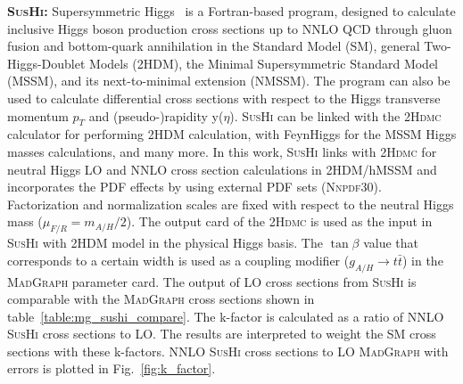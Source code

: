 \textbf{\textsc{SusHi:}} Supersymmetric Higgs~\cite{sushi} is a Fortran-based program, designed to calculate inclusive Higgs boson production cross sections up to NNLO QCD through gluon fusion and bottom-quark annihilation in the Standard Model (SM), general Two-Higgs-Doublet Models (2HDM), the Minimal Supersymmetric Standard Model (MSSM), and its next-to-minimal extension (NMSSM). The program can also be used to calculate differential cross sections with respect to the Higgs transverse momentum $p_{T}$ and (pseudo-)rapidity y($\eta$). \textsc{SusHi} can be linked with the \textsc{2Hdmc} calculator for performing 2HDM calculation, with FeynHiggs for the MSSM Higgs masses calculations, and many more. In this work, \textsc{SusHi} links with \textsc{2Hdmc} for neutral Higgs LO and NNLO cross section calculations in 2HDM/hMSSM and incorporates the PDF effects by using external PDF sets (\textsc{Nnpdf30}). Factorization and normalization scales are fixed with respect to the neutral Higgs mass ($\mu_{F/R} = m_{A/H}/2$). The output card of the \textsc{2Hdmc} is used as the input in \textsc{SusHi} with 2HDM model in the physical Higgs basis. The $\tan\beta$ value that corresponds to a certain width is used as a coupling modifier ($g_{A/H}\rightarrow t\bar{t}$) in the \textsc{MadGraph} parameter card. The output of LO cross sections from \textsc{SusHi} is comparable with the \textsc{MadGraph} cross sections shown in table~\ref{table:mg_sushi_compare}. The k-factor is calculated as a ratio of NNLO \textsc{SusHi} cross sections to LO. The results are interpreted to weight the SM cross sections with these k-factors. NNLO \textsc{SusHi} cross sections to LO \textsc{MadGraph} with errors is plotted in Fig.~\ref{fig:k_factor}.
